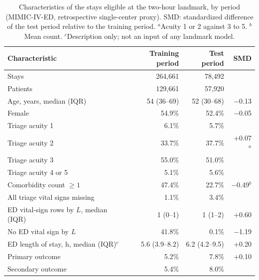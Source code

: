\begin{table}[t]
\centering
\caption{Characteristics of the stays eligible at the two-hour landmark, by period (MIMIC-IV-ED, retrospective single-center proxy). SMD: standardized difference of the test period relative to the training period. $^a$Acuity 1 or 2 against 3 to 5. $^b$Mean count. $^c$Description only; not an input of any landmark model.}
\label{tab:characteristics}
\begin{tabular}{lrrr}
\toprule
Characteristic & Training period & Test period & SMD \\
\midrule
Stays & 264,661 & 78,492 &  \\
Patients & 129,661 & 57,920 &  \\
Age, years, median (IQR) & 54 (36--69) & 52 (30--68) & \ensuremath{-}0.13 \\
Female & 54.9\% & 52.4\% & \ensuremath{-}0.05 \\
Triage acuity 1 & 6.1\% & 5.7\% &  \\
Triage acuity 2 & 33.7\% & 37.7\% & +0.07$^a$ \\
Triage acuity 3 & 55.0\% & 51.0\% &  \\
Triage acuity 4 or 5 & 5.1\% & 5.6\% &  \\
Comorbidity count $\geq 1$ & 47.4\% & 22.7\% & \ensuremath{-}0.49$^b$ \\
All triage vital signs missing & 1.1\% & 3.4\% &  \\
ED vital-sign rows by $L$, median (IQR) & 1 (0--1) & 1 (1--2) & +0.60 \\
No ED vital sign by $L$ & 41.8\% & 0.1\% & \ensuremath{-}1.19 \\
ED length of stay, h, median (IQR)$^c$ & 5.6 (3.9--8.2) & 6.2 (4.2--9.5) & +0.20 \\
Primary outcome & 5.2\% & 7.8\% & +0.10 \\
Secondary outcome & 5.4\% & 8.0\% &  \\
\bottomrule
\end{tabular}
\end{table}
